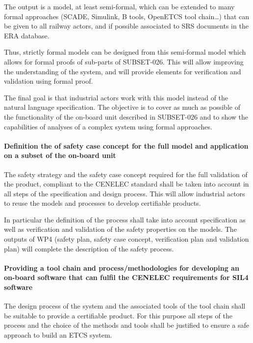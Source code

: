 \documentclass{template/openetcs_article}
\begin{document}
The output is a model, at least semi-formal, which can be extended to many formal approaches (SCADE,
Simulink, B tools, OpenETCS tool chain…) that can be given to all railway actors, and
if possible associated to SRS documents in the ERA database.

Thus, strictly formal models can be designed from this semi-formal model which allows for formal proofs of sub-parts of SUBSET-026. This will allow improving the understanding of the system, and will provide elements for verification and validation using formal proof.

The final goal is that industrial actors work with this model instead of the
natural language specification.
The objective is to cover as much as possible of the functionality of the on-board unit described in SUBSET-026 and to show the capabilities of analyses of a complex system using formal approaches.


\paragraph{Definition the of safety case concept for the full model and application on a subset of the on-board unit}
The safety strategy and the safety case concept required for the full validation of the product, compliant to the CENELEC standard shall be taken into account in all steps of the specification and design process. This will allow industrial actors to reuse the models and processes to develop certifiable products.

In particular the definition of the process shall take into account specification as well as verification and validation of the safety properties on the models. The outputs of WP4 (safety plan, safety case concept, verification plan and validation plan) will complete the description of the safety process.


\paragraph{Providing a tool chain and process/methodologies for developing
an on-board software that can fulfil the CENELEC requirements for SIL4 software}

The design process of the system and the associated tools of the tool chain shall be suitable to provide a certifiable product. For this purpose all steps of the process and the choice of the methods and tools shall be justified to ensure a safe approach to build an ETCS system.
\end{document}
